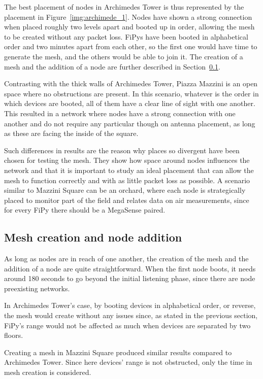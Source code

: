 			The best placement of nodes in Archimedes Tower is thus represented by the placement in Figure~\ref{img:archimede_1}.
			Nodes have shown a strong connection when placed roughly two levels apart and booted up in order, allowing the mesh to be created without any packet loss.
			FiPys have been booted in alphabetical order and two minutes apart from each other, so the first one would have time to generate the mesh, and the others would be able to join it.
			The creation of a mesh and the addition of a node are further described in  Section~\ref{subsec:node_addition}.
			
			Contrasting with the thick walls of Archimedes Tower, Piazza Mazzini is an open space where no obstructions are present.
			In this scenario, whatever is the order in which devices are booted, all of them have a clear line of sight with one another.
			This resulted in a network where nodes have a strong connection with one another and do not require any particular though on antenna placement, as long as these are facing the inside of the square.
			
			Such differences in results are the reason why places so divergent have been chosen for testing the mesh.
			They show how space around nodes influences the network and that it is important to study an ideal placement that can allow the mesh to function correctly and with as little packet loss as possible.
			A scenario similar to Mazzini Square can be an orchard, where each node is strategically placed to monitor part of the field and relates data on air measurements, since for every FiPy there should be a MegaSense paired.
			
		\subsection{Mesh creation and node addition}\label{subsec:node_addition}
		
			As long as nodes are in reach of one another, the creation of the mesh and the addition of a node are quite straightforward.
			When the first node boots, it needs around 180 seconds to go beyond the initial listening phase, since there are node preexisting networks.
			
			In Archimedes Tower's case, by booting devices in alphabetical order, or reverse, the mesh would create without any issues since, as stated in the previous section, FiPy's range would not be affected as much when devices are separated by two floors. 
			
			Creating a mesh in Mazzini Square produced similar results compared to Archimedes Tower.
			Since here devices' range is not obstructed, only the time in mesh creation is considered.
			
